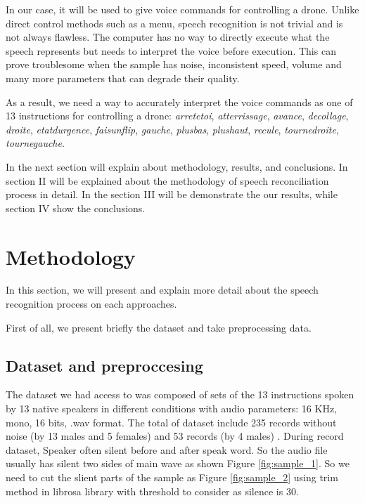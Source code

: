 \documentclass[%
  article,%
  10pt,%
  a4paper,%
  fleqn,%
  oneside,%
  sumario = tradicional,%
  chapter = TITLE,%
  section = TITLE,%
]{abntex2}
\begin{document}

In our case, it will be used to give voice commands for controlling a drone. Unlike direct control methods such as a menu, speech recognition is not trivial and is not always flawless. The computer has no way to directly execute what the speech represents but needs to interpret the voice before execution. This can prove troublesome when the sample has noise, inconsistent speed, volume and many more parameters that can degrade their quality.

As a result, we need a way to accurately interpret the voice commands as one of 13 instructions for controlling a drone: \textit{arretetoi}, \textit{atterrissage}, \textit{avance}, \textit{decollage}, \textit{droite}, \textit{etatdurgence}, \textit{faisunflip}, \textit{gauche}, \textit{plusbas}, \textit{plushaut}, \textit{recule}, \textit{tournedroite}, \textit{tournegauche}.

In the next section will explain about methodology, results, and conclusions. In section II will be explained about the methodology of speech reconciliation process in detail. In the section III will be demonstrate the our results, while section IV show the conclusions. 

\section{Methodology}\label{sec:met}
In this section, we will present and explain more detail about the speech recognition process on each approaches.

First of all, we present briefly the dataset and take preprocessing data.
\subsection{Dataset and preproccesing}
The dataset we had access to was composed of sets of the 13 instructions spoken by 13 native speakers in different conditions with audio parameters: 16 KHz, mono, 16 bits, .wav format. The total of dataset include 235 records without noise (by 13 males and 5 females) and 53 records (by 4 males) .
During record dataset, Speaker often silent before and after speak word. So the audio file usually has silent two sides of main wave as shown Figure \ref{fig:sample_1}. So we need to cut the slient parts of the sample as Figure \ref{fig:sample_2} using trim method in librosa library with threshold to consider as silence is 30.
\end{document}
